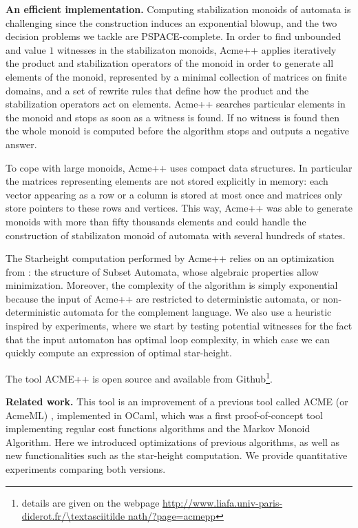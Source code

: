 \textbf{An efficient implementation.} Computing stabilization monoids of automata is challenging since the construction induces an exponential blowup, and the two decision problems we tackle are PSPACE-complete. In order to find unbounded and value $1$ witnesses in the stabilizaton monoids, Acme++
%
applies iteratively the product and stabilization operators of the monoid in order to generate all elements of the monoid, represented by a minimal collection of matrices on finite domains, and a set of rewrite rules that define how the product and the stabilization operators act on elements.
Acme++ searches particular elements in the monoid and stops as soon as a witness is found. If no witness is found then the whole monoid is computed before the algorithm stops and outputs a negative answer.

To cope with large monoids, Acme++ uses compact data structures. In particular the matrices representing elements are not stored explicitly in memory: each vector appearing as a row or a column is stored at most once and matrices only store pointers to these rows and vertices. This way, Acme++ was able to generate monoids with more than fifty thousands elements and could handle the construction of stabilizaton monoid of automata with several hundreds of states.

The Starheight computation performed by Acme++ relies on an optimization from \cite{CL08sh}: the structure of Subset Automata, whose algebraic properties allow minimization. Moreover, the complexity of the algorithm is simply exponential because the input of Acme++ are restricted to deterministic automata, or non-deterministic automata for the complement language. We also use a heuristic inspired by experiments, where we start by testing potential witnesses for the fact that the input automaton has optimal loop complexity, in which case we can quickly compute an expression of optimal star-height.

The tool ACME++ is open source and available from Github\footnote{details are given on the webpage
\url{http://www.liafa.univ-paris-diderot.fr/\textasciitilde nath/?page=acmepp}}.

\textbf{Related work.}
This tool is an improvement of a previous tool called ACME (or AcmeML) \cite{FK14}, implemented in OCaml, which was a first proof-of-concept tool implementing regular cost functions algorithms and the Markov Monoid Algorithm.
Here we introduced optimizations of previous algorithms, as well as new functionalities such as the star-height computation. We provide quantitative experiments comparing both versions.




